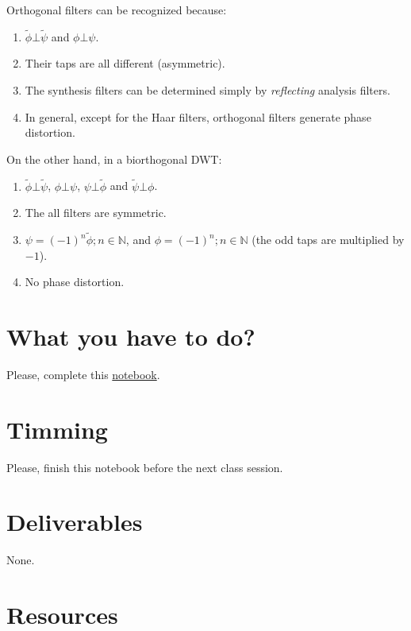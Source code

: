 Orthogonal filters can be recognized because:
\begin{enumerate}
\item $\tilde\phi\bot\tilde\psi$ and $\phi\bot\psi$.
\item Their taps are all different (asymmetric).
\item The synthesis filters can be determined simply by
  \emph{reflecting} analysis filters.
\item In general, except for the Haar filters, orthogonal filters
  generate phase distortion.
\end{enumerate}

On the other hand, in a biorthogonal DWT:
\begin{enumerate}
\item $\tilde\phi\bot\tilde\psi$, $\phi\bot\psi$, $\psi\bot\tilde\phi$
  and $\tilde\psi\bot\phi$.
\item The all filters are symmetric.
\item $\psi=(-1)^n\tilde\phi; n\in\mathbb{N}$, and
  $\phi=(-1)^n; n\in\mathbb{N}$ (the odd taps are multiplied by $-1$).
\item No phase distortion.
\end{enumerate}

\section{What you have to do?}
  
Please, complete this
\href{https://github.com/Sistemas-Multimedia/Sistemas-Multimedia.github.io/blob/master/study_guide/MDWT/MDWT.ipynb}{notebook}.

\section{Timming}

Please, finish this notebook before the next class session.

\section{Deliverables}

None.

\section{Resources}


